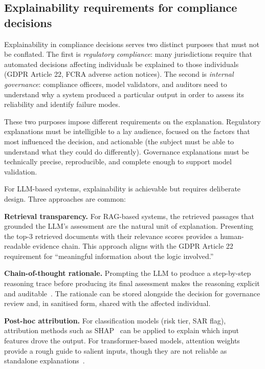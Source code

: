 \subsection{Explainability requirements for compliance decisions}
\label{sec:ch11-explainability}

Explainability in compliance decisions serves two distinct purposes that must not be conflated. The first is \emph{regulatory compliance}: many jurisdictions require that automated decisions affecting individuals be explained to those individuals (GDPR Article 22, FCRA adverse action notices). The second is \emph{internal governance}: compliance officers, model validators, and auditors need to understand why a system produced a particular output in order to assess its reliability and identify failure modes.

These two purposes impose different requirements on the explanation. Regulatory explanations must be intelligible to a lay audience, focused on the factors that most influenced the decision, and actionable (the subject must be able to understand what they could do differently). Governance explanations must be technically precise, reproducible, and complete enough to support model validation.

For LLM-based systems, explainability is achievable but requires deliberate design. Three approaches are common:

\textbf{Retrieval transparency.} For RAG-based systems, the retrieved passages that grounded the LLM's assessment are the natural unit of explanation. Presenting the top-3 retrieved documents with their relevance scores provides a human-readable evidence chain. This approach aligns with the GDPR Article 22 requirement for ``meaningful information about the logic involved.''

\textbf{Chain-of-thought rationale.} Prompting the LLM to produce a step-by-step reasoning trace before producing its final assessment makes the reasoning explicit and auditable~\cite{wei2022chain}. The rationale can be stored alongside the decision for governance review and, in sanitised form, shared with the affected individual.

\textbf{Post-hoc attribution.} For classification models (risk tier, SAR flag), attribution methods such as SHAP~\cite{lundberg2017unified} can be applied to explain which input features drove the output. For transformer-based models, attention weights provide a rough guide to salient inputs, though they are not reliable as standalone explanations~\cite{clark2019bert}.

